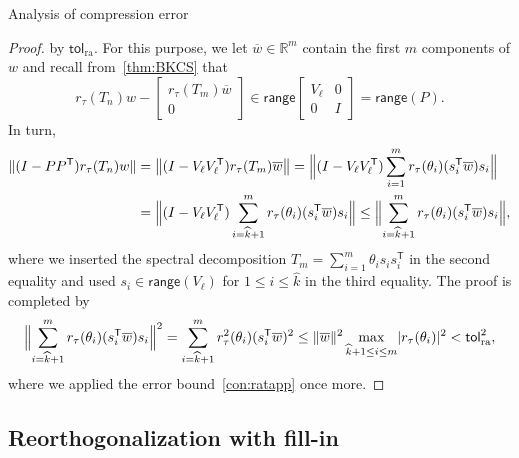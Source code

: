 \documentclass{siamart190516}
\newcommand{\Ttran}{\mathsf{T}}
\newcommand{\tol}{\mathsf{tol}}
\newcommand{\R}{\mathbb{R}}
\newcommand{\range}{\mathsf{range}}
\providecommand{\abs}[1]{\lvert#1\rvert}
\providecommand{\norm}[1]{\lVert#1\rVert}
\providecommand{\bignorm}[1]{\bigl\lVert#1\bigr\rVert}
\providecommand{\Bignorm}[1]{\Bigl\lVert#1\Bigr\rVert}
\begin{document}
\begin{paragraph}{Analysis of compression error}
\begin{proof}
    by $\tol_{\mathrm{ra}}$. For this purpose, we let 
    $\overline{w}\in\R^{m}$ contain the first $m$ components of $w$ and 
    recall from~\cref{thm:BKCS} that
    \begin{equation*}
        r_{\tau}(T_{n})w - \begin{bmatrix}
            r_{\tau}(T_{m})\overline{w}\\0
        \end{bmatrix}\in 
            \range\begin{bmatrix}
            V_{\ell}& 0 \\ 0 & I
        \end{bmatrix}=\range(P).
    \end{equation*}
    In turn,
    \begin{equation*}
        \begin{aligned}
            \norm{(I-PP^{\Ttran})r_{\tau}(T_{n})w} &= \bignorm{(I-V_{\ell}V_{\ell}^{\Ttran})r_{\tau}(T_{m})\overline{w}} =\Bignorm{(I-V_{\ell}V_{\ell}^{\Ttran})\sum_{i=1}^{m}r_{\tau}(\theta_{i})(s_{i}^{\Ttran}\overline{w})s_{i}} \\ 
            &= \Bignorm{(I-V_{\ell}V_{\ell}^{\Ttran})\sum_{i=\widehat{k}+1}^{m}r_{\tau}(\theta_{i})(s_{i}^{\Ttran}\overline{w})s_{i}}
            \leq \Bignorm{\sum_{i=\widehat{k}+1}^{m}r_{\tau}(\theta_{i})(s_{i}^{\Ttran}\overline{w})s_{i}},
        \end{aligned}
    \end{equation*}
    where we inserted the spectral decomposition $T_{m}=\sum_{i=1}^{m}\theta_{i}s_{i}s_{i}^{\Ttran}$ in the second equality and used $s_{i}\in\range(V_{\ell})$ for $1\leq i\leq \widehat{k}$ in the third equality. The proof is completed by  
    \begin{equation*}
        \Bignorm{\sum_{i=\widehat{k}+1}^{m}r_{\tau}(\theta_{i})(s_{i}^{\Ttran}\overline{w})s_{i}}^{2}
        =\sum_{i=\widehat{k}+1}^{m}r_{\tau}^{2}(\theta_{i})(s_{i}^{\Ttran}\overline{w})^{2} \leq \norm{\overline{w}}^{2}\max_{\widehat{k}+1\leq i\leq m}\abs{r_{\tau}(\theta_{i})}^{2}
        < \tol_{\mathrm{ra}}^{2},  
    \end{equation*}
    where we applied the error bound~\cref{con:ratapp} once more. 
\end{proof}
\end{paragraph}


\subsection{Reorthogonalization with fill-in}
\label{sec:reorth}
\end{document}
